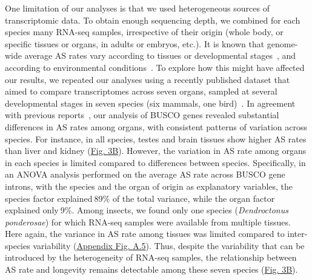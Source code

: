 One limitation of our analyses is that we used heterogeneous sources of transcriptomic data. To obtain enough sequencing depth, we combined for each species many RNA-seq samples, irrespective of their origin (whole body, or specific tissues or organs, in adults or embryos, etc.). It is known that genome-wide average AS rates vary according to tissues or developmental stages~\citep{barbosa-morais_evolutionary_2012,mazin_alternative_2021}, and according to environmental conditions~\citep{john_regulation_2021}. To explore how this might have affected our results, we repeated our analyses using a recently published dataset that aimed to compare transcriptomes across seven organs, sampled at several developmental stages in seven species (six mammals, one bird)~\citep{cardoso-moreira_gene_2019}. In agreement with previous reports~\citep{mazin_alternative_2021}, our analysis of \acrshort{BUSCO} genes revealed substantial differences in AS rates among organs, with consistent patterns of variation across species. For instance, in all species, testes and brain tissues show higher AS rates than liver and kidney (\hyperref[fig:AS3]{Fig. 3B}). However, the variation in AS rate among organs in each species is limited compared to differences between species. Specifically, in an ANOVA analysis performed on the average AS rate across \acrshort{BUSCO} gene introns, with the species and the organ of origin as explanatory variables, the species factor explained$~$89\% of the total variance, while the organ factor explained only$~$9\%. Among insects, we found only one species (\textit{Dendroctonus ponderosae}) for which RNA-seq samples were available from multiple tissues. Here again, the variance in AS rate among tissues was limited compared to inter-species variability (\hyperref[supp_fig:AS5]{Appendix Fig. A.5}). Thus, despite the variability that can be introduced by the heterogeneity of RNA-seq samples, the relationship between AS rate and longevity remains detectable among these seven species (\hyperref[fig:AS3]{Fig. 3B}). 

